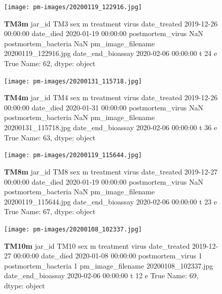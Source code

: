 \begin{figure}[h!]
\centering
\texttt{[image: pm-images/20200119\_122916.jpg]}
\caption{\textbf{TM3m} jar\_id                                 TM3
sex                                      m
treatment                            virus
date\_treated           2019-12-26 00:00:00
date\_died              2020-01-19 00:00:00
postmortem\_virus                       NaN
postmortem\_bacteria                    NaN
pm\_image\_filename      20200119\_122916.jpg
date\_end\_bioassay      2020-02-06 00:00:00
t                                       24
e                                     True
Name: 62, dtype: object}
\end{figure}
\clearpage

\begin{figure}[h!]
\centering
\texttt{[image: pm-images/20200131\_115718.jpg]}
\caption{\textbf{TM4m} jar\_id                                 TM4
sex                                      m
treatment                            virus
date\_treated           2019-12-26 00:00:00
date\_died              2020-01-31 00:00:00
postmortem\_virus                       NaN
postmortem\_bacteria                    NaN
pm\_image\_filename      20200131\_115718.jpg
date\_end\_bioassay      2020-02-06 00:00:00
t                                       36
e                                     True
Name: 63, dtype: object}
\end{figure}
\clearpage

\begin{figure}[h!]
\centering
\texttt{[image: pm-images/20200119\_115644.jpg]}
\caption{\textbf{TM8m} jar\_id                                 TM8
sex                                      m
treatment                            virus
date\_treated           2019-12-27 00:00:00
date\_died              2020-01-19 00:00:00
postmortem\_virus                       NaN
postmortem\_bacteria                    NaN
pm\_image\_filename      20200119\_115644.jpg
date\_end\_bioassay      2020-02-06 00:00:00
t                                       23
e                                     True
Name: 67, dtype: object}
\end{figure}
\clearpage

\begin{figure}[h!]
\centering
\texttt{[image: pm-images/20200108\_102337.jpg]}
\caption{\textbf{TM10m} jar\_id                                TM10
sex                                      m
treatment                            virus
date\_treated           2019-12-27 00:00:00
date\_died              2020-01-08 00:00:00
postmortem\_virus                         1
postmortem\_bacteria                      1
pm\_image\_filename      20200108\_102337.jpg
date\_end\_bioassay      2020-02-06 00:00:00
t                                       12
e                                     True
Name: 69, dtype: object}
\end{figure}
\clearpage

